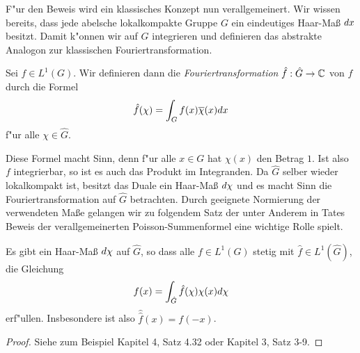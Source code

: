 	F"ur den Beweis wird ein klassisches Konzept nun verallgemeinert.
	Wir wissen bereits, dass jede abelsche lokalkompakte Gruppe $G$ ein eindeutiges Haar-Maß $\dx$ besitzt.
	Damit k"onnen wir auf $G$ integrieren und definieren das abstrakte Analogon zur klassischen Fouriertransformation.
	\begin{defi}[Fouriertransformation]
		Sei $f\in L^1(G)$. Wir definieren dann die \emph{Fouriertransformation} $\hat{f}: \hat{G} \to \Komplex$ von $f$ durch die Formel
		\begin{align*}
			\hat{f}(\chi) = \int_G f(x)\conj{\chi}(x) dx
		\end{align*}
		f"ur alle $\chi\in \hat{G}$.
	\end{defi}
	Diese Formel macht Sinn, denn f"ur alle $x \in G$ hat $\chi(x)$ den Betrag $1$. 
	Ist also $f$ integrierbar, so ist es auch das Produkt im Integranden.
	Da $\hat{G}$ selber wieder lokalkompakt ist, besitzt das Duale ein Haar-Maß $\dx[\chi]$ und es macht Sinn die Fouriertransformation auf $\hat{G}$ betrachten.
	Durch geeignete Normierung der verwendeten Maße gelangen wir zu folgendem Satz der unter Anderem in Tates Beweis der verallgemeinerten Poisson-Summenformel eine wichtige Rolle spielt.
	\begin{satz}\label{satz:topogroup:umkehrformel}
		Es gibt ein Haar-Maß $\dx[\chi]$ auf $\hat{G}$, so dass alle $f \in L^1(G)$ stetig mit $\hat{f} \in L^1(\hat{G})$, die Gleichung
		\begin{align*}
			f(x) = \int_{\hat{G}} \hat{f}(\chi) \chi(x) \dx[\chi]
		\end{align*}
		erf"ullen. Insbesondere ist also $\hat{\hat{f}}(x) = f(-x)$.
	\end{satz}
	\begin{proof}
		Siehe zum Beispiel \textcite{folland} Kapitel 4, Satz 4.32 oder \textcite{rama} Kapitel 3, Satz 3-9.
	\end{proof}

	
	
